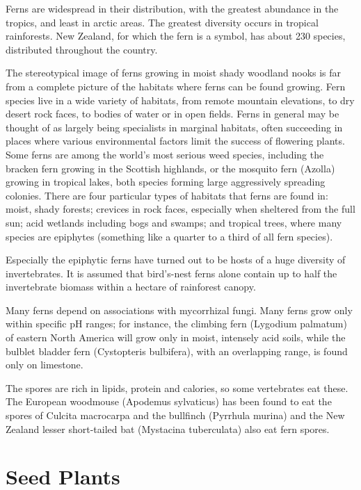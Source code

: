 Ferns are widespread in their distribution, with the greatest abundance in the tropics, and least in arctic areas. The greatest diversity occurs in tropical rainforests. New Zealand, for which the fern is a symbol, has about 230 species, distributed throughout the country.

The stereotypical image of ferns growing in moist shady woodland nooks is far from a complete picture of the habitats where ferns can be found growing. Fern species live in a wide variety of habitats, from remote mountain elevations, to dry desert rock faces, to bodies of water or in open fields. Ferns in general may be thought of as largely being specialists in marginal habitats, often succeeding in places where various environmental factors limit the success of flowering plants. Some ferns are among the world's most serious weed species, including the bracken fern growing in the Scottish highlands, or the mosquito fern (Azolla) growing in tropical lakes, both species forming large aggressively spreading colonies. There are four particular types of habitats that ferns are found in: moist, shady forests; crevices in rock faces, especially when sheltered from the full sun; acid wetlands including bogs and swamps; and tropical trees, where many species are epiphytes (something like a quarter to a third of all fern species).

Especially the epiphytic ferns have turned out to be hosts of a huge diversity of invertebrates. It is assumed that bird's-nest ferns alone contain up to half the invertebrate biomass within a hectare of rainforest canopy.

Many ferns depend on associations with mycorrhizal fungi. Many ferns grow only within specific pH ranges; for instance, the climbing fern (Lygodium palmatum) of eastern North America will grow only in moist, intensely acid soils, while the bulblet bladder fern (Cystopteris bulbifera), with an overlapping range, is found only on limestone.

The spores are rich in lipids, protein and calories, so some vertebrates eat these. The European woodmouse (Apodemus sylvaticus) has been found to eat the spores of Culcita macrocarpa and the bullfinch (Pyrrhula murina) and the New Zealand lesser short-tailed bat (Mystacina tuberculata) also eat fern spores.

\hypertarget{seed-plants}{%
\section{Seed Plants}\label{seed-plants}}

